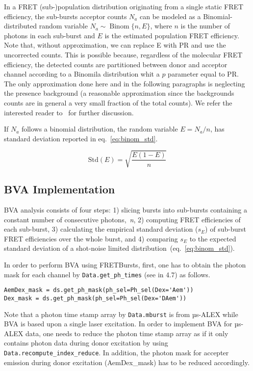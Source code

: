 In a FRET (sub-)population distribution originating from a single static FRET efficiency,
the sub-bursts acceptor counts $N_a$ can be modeled as a Binomial-distributed random variable 
$N_a \sim \operatorname{Binom} \{n, E\}$, where $n$ is the number of photons in each sub-burst and 
$E$ is the estimated population FRET efficiency. Note that, without approximation, we can replace 
E with PR and use the uncorrected counts. This is possible because, regardless of the 
molecular FRET efficiency, the detected counts are partitioned between donor and acceptor channel
according to a Binomila distribution whit a $p$ parameter equal to PR.
The only approximation done here and in the following paragraphs is neglecting the presence background
(a reasonable approximation since the backgrounds counts are in general a very small fraction of
the total counts). 
We refer the interested reader to~\cite{Torella_2011} for further discussion.

If $N_a$ follows a binomial distribution, the random variable $E = N_a/n$,
has standard deviation reported in eq.~\ref{eq:binom_std}. 

\begin{equation}
\label{eq:binom_std}
\operatorname{Std(\textit{E})} = {\sqrt{\frac{E(1 - E)}{n}}}
\end{equation}

\subsection{BVA Implementation}
BVA analysis consists of four steps: 1) slicing bursts into sub-bursts containing a constant number of consecutive photons,~\textit{n}, 2) computing FRET efficiencies of each sub-burst, 3) calculating the empirical standard deviation ($s_E$) of sub-burst FRET efficiencies over the whole burst, and 4) comparing $s_E$ to the expected standard deviation of a shot-noise limited distribution~(eq.~\ref{eq:binom_std}). 

In order to perform BVA using FRETBursts, first, one has to obtain the photon mask for each channel by \verb|Data.get_ph_times| (see in 4.7) as follows.

\begin{lstlisting}
AemDex_mask = ds.get_ph_mask(ph_sel=Ph_sel(Dex='Aem')) 
Dex_mask = ds.get_ph_mask(ph_sel=Ph_sel(Dex='DAem'))   
\end{lstlisting}

Note that a photon time stamp array by \verb|Data.mburst| is from µs-ALEX while BVA is based upon a single laser excitation. In order to implement BVA for µs-ALEX data, one needs to reduce the photon time stamp array as if it only contains photon data during donor excitation by using \verb|Data.recompute_index_reduce|. In addition, the photon mask for accepter emission during donor excitation (AemDex_mask) has to be reduced accordingly.

